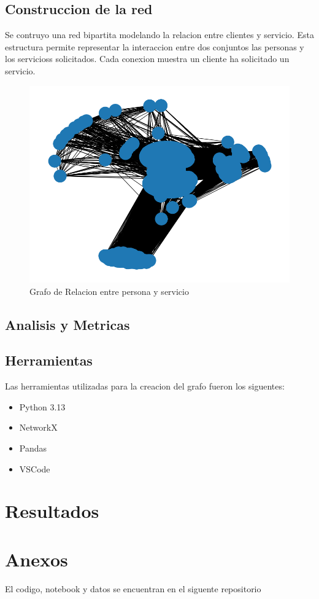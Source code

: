 \documentclass[twocolumn]{article}
\begin{document}
\subsection{Construccion de la red}
Se contruyo una red bipartita modelando la relacion entre clientes y servicio. Esta estructura permite representar la interaccion entre dos conjuntos las personas y los servicioss solicitados. Cada conexion muestra un cliente ha solicitado un servicio.

\begin{figure}[H]
    \centering
    \includegraphics[width=\columnwidth]{img/Grafo.png}
    \caption{Grafo de Relacion entre persona y servicio}
    \label{fig:Grafo}
\end{figure}

\subsection{Analisis y Metricas}
\blindtext[1]

\subsection{Herramientas}
Las herramientas utilizadas para la creacion del grafo fueron los siguentes:
\begin{itemize}
    \item Python 3.13
    \item NetworkX
    \item Pandas
    \item VSCode
\end{itemize}

\section{Resultados}
\blindtext[4]

\printbibliography

\section{Anexos}
El codigo, notebook y datos se encuentran en el siguente repositorio \parencite{repoCodigo}
\end{document}
